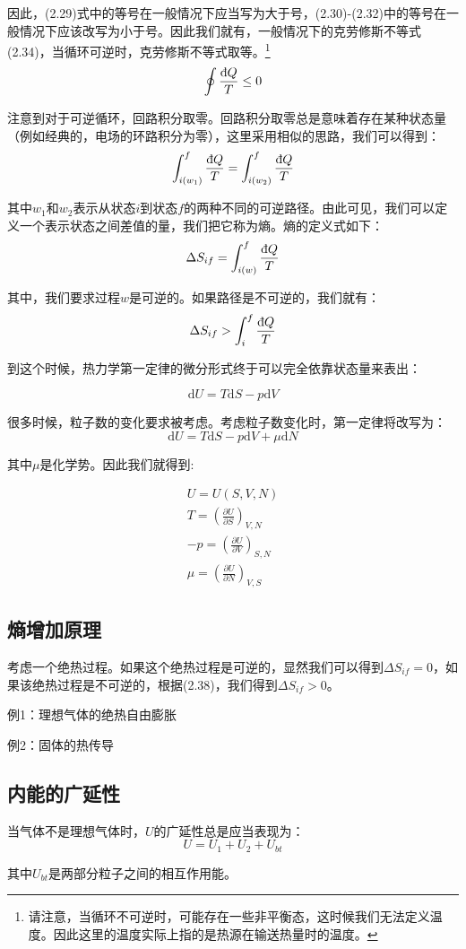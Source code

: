 \documentclass[a4paper, 10pt, openany]{book}%
\begin{document}
因此，(2.29)式中的等号在一般情况下应当写为大于号，(2.30)-(2.32)中的等号在一般情况下应该改写为小于号。因此我们就有，一般情况下的克劳修斯不等式(2.34)，当循环可逆时，克劳修斯不等式取等。\footnote{请注意，当循环不可逆时，可能存在一些非平衡态，这时候我们无法定义温度。因此这里的温度实际上指的是热源在输送热量时的温度。}
\begin{equation}
  \oint \frac{\text{\dj}Q}{T}\leq0
\end{equation}

注意到对于可逆循环，回路积分取零。回路积分取零总是意味着存在某种状态量（例如经典的，电场的环路积分为零），这里采用相似的思路，我们可以得到：
\begin{equation}
  \int_{i(w_1)}^f\frac{\text{\dj}Q}{T}=\int_{i(w_2)}^f\frac{\text{\dj}Q}{T}
\end{equation}

其中$w_1$和$w_2$表示从状态$i$到状态$f$的两种不同的可逆路径。由此可见，我们可以定义一个表示状态之间差值的量，我们把它称为熵。熵的定义式如下：
\begin{equation}
  \Delta S_{if}=\int_{i(w)}^f\frac{\text{\dj}Q}{T}
\end{equation}

其中，我们要求过程$w$是可逆的。如果路径是不可逆的，我们就有：
\begin{equation}
\Delta S_{if}>\int_i^f\frac{\text{\dj}Q}{T}
\end{equation}

到这个时候，热力学第一定律的微分形式终于可以完全依靠状态量来表出：

\begin{equation}
\mathrm{d}U=T\mathrm{d}S-p\mathrm{d}V
\end{equation}

很多时候，粒子数的变化要求被考虑。考虑粒子数变化时，第一定律将改写为：
\begin{equation}
\mathrm{d}U=T\mathrm{d}S-p\mathrm{d}V+\mu\mathrm{d}N
\end{equation}

其中$\mu$是化学势。因此我们就得到:

\begin{align}
U=U(S,V,N)\\
T=\left(\frac{\partial U}{\partial S}\right)_{V,N}\\
-p=\left(\frac{\partial U}{\partial V}\right)_{S,N}\\
\mu=\left(\frac{\partial U}{\partial N}\right)_{V,S}
\end{align}



\subsection{熵增加原理}
考虑一个绝热过程。如果这个绝热过程是可逆的，显然我们可以得到$\Delta S_{if}=0$，如果该绝热过程是不可逆的，根据(2.38)，我们得到$\Delta S_{if}>0$。

\noindent 例1：理想气体的绝热自由膨胀

\noindent 例2：固体的热传导

\subsection{内能的广延性}
当气体不是理想气体时，$U$的广延性总是应当表现为：
\begin{equation}
U=U_1+U_2+U_{bt}
\end{equation}

其中$U_{bt}$是两部分粒子之间的相互作用能。
\end{document}
